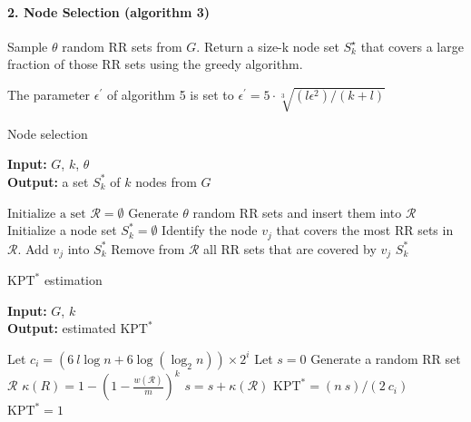 \documentclass[a4paper,12pt]{article}
\begin{document}
\paragraph{2. Node Selection (algorithm 3)}
Sample $\theta$ random RR sets from $G$. Return a size-k node set $S_k^{\star}$ that covers a large fraction of those RR sets using the greedy algorithm.

The parameter $\epsilon^{'}$ of algorithm 5 is set to $\epsilon^{'} = 5 \cdot \sqrt[3]{(l \epsilon^{2}) / (k + l)}$

\begin{algorithm}
\caption{Node selection}\label{alg:oracle}
\hspace*{\algorithmicindent} \textbf{Input: } $G$, $k$, $\theta$\\
\hspace*{\algorithmicindent} \textbf{Output: } a set $S_k^*$ of $k$ nodes from $G$
\begin{algorithmic}[1]
\State $\text{Initialize a set } \mathcal{R} = \emptyset$
\State Generate $\theta$ random RR sets and insert them into $\mathcal{R}$
\State Initialize a node set $S_k^* = \emptyset$
\State Identify the node $v_j$ that covers the most RR sets in $\mathcal{R}$.
\State Add $v_j$ into $S_k^*$
\State Remove from $\mathcal{R}$ all RR sets that are covered by $v_j$
\EndFor
\State\Return $S_k^*$
\end{algorithmic}
\end{algorithm}

\begin{algorithm}
\caption{$\text{KPT}^*$ estimation}\label{alg:kptestimation}
\hspace*{\algorithmicindent} \textbf{Input: } $G$, $k$\\
\hspace*{\algorithmicindent} \textbf{Output: } estimated $\text{KPT}^*$
\begin{algorithmic}[1]
\State Let $c_i = (6 \ l\log n + 6\log(\log_2 n))\times 2^i$
\State Let $s = 0$
\State Generate a random RR set $\mathcal{R}$
\State $\kappa(R) = 1 - \left(1-\frac{w(\mathcal{R})}{m}\right)^k$
\State $s = s + \kappa(\mathcal{R})$
\EndFor
{}
\State\Return $\text{KPT}^* = (n \ s)/(2 \ c_i)$
\EndIf
\EndFor
\State\Return $\text{KPT}^* = 1$
\end{algorithmic}
\end{algorithm}
\end{document}
